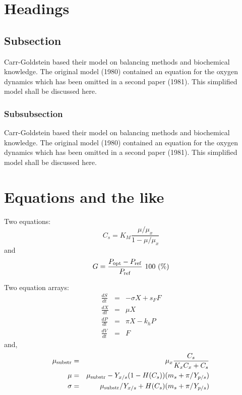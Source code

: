 \documentclass[joc]{ipart}
\theoremstyle{plain}
\begin{document}
\section{Headings}

\subsection{Subsection}
Carr-Goldstein based their model on balancing methods and
biochemical know\-ledge. The original model (1980) contained an equation for the
oxygen dynamics which has been omitted in a second paper
(1981). This simplified model shall be discussed here.

\subsubsection{Subsubsection}
Carr-Goldstein
based their model on balancing methods and
biochemical know\-ledge. The original model (1980) contained an equation for the
oxygen dynamics which has been omitted in a second paper
(1981). This simplified model shall be discussed here.

\section{Equations and the like}

Two equations:
\begin{equation}
    C_{s}  =  K_{M} \frac{\mu/\mu_{x}}{1-\mu/\mu_{x}} \label{ccs}
\end{equation}
and
\begin{equation}
    G = \frac{P_{\rm opt} - P_{\rm ref}}{P_{\rm ref}} \mbox{\ }100 \mbox{\ }(\%)
\end{equation}

Two equation arrays:
\begin{eqnarray}
  \frac{dS}{dt} & = & - \sigma X + s_{F} F\\
  \frac{dX}{dt} & = &   \mu    X\\
  \frac{dP}{dt} & = &   \pi    X - k_{h} P\\
  \frac{dV}{dt} & = &   F
\end{eqnarray}
and,
\begin{eqnarray}
 \mu_{\rm substr} & = & \mu_{x} \frac{C_{s}}{K_{x}C_{x}+C_{s}}  \\
 \mu              & = & \mu_{\rm substr} - Y_{x/s}(1-H(C_{s}))(m_{s}+\pi /Y_{p/s}) \\
 \sigma           & = & \mu_{\rm substr}/Y_{x/s}+ H(C_{s}) (m_{s}+ \pi /Y_{p/s})
\end{eqnarray}
\end{document}
